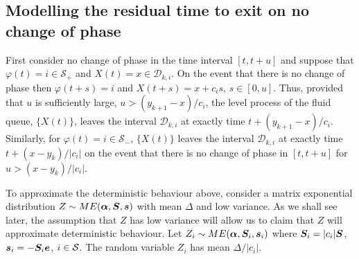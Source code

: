 \subsection{Modelling the residual time to exit on no change of phase} 
First consider no change of phase in the time interval \([t,t+u]\) and suppose that \(\varphi(t)=i\in\mathcal S_+\) and \(X(t) = x\in\mathcal D_{k,i}\). On the event that there is no change of phase then \(\varphi(t+s) = i\) and \(X(t+s) = x+c_i s\), \(s\in{}[0,u]\). Thus, provided that \(u\) is sufficiently large, \(u>(y_{k+1}-x)/c_i\), the level process of the fluid queue, \(\{X(t)\}\), leaves the interval \(\mathcal D_{k,i}\) at exactly time \(t+(y_{k+1} - x)/c_i\). Similarly, for \(\varphi(t)=i\in\mathcal S_-\), \(\{X(t)\}\) leaves the interval \(\mathcal D_{k,i}\) at exactly time \(t+(x-y_k)/|c_i|\) on the event that there is no change of phase in \([t,t+u]\) for \(u>(x-y_k)/|c_i|\). 

To approximate the deterministic behaviour above, consider a matrix exponential distribution \(Z\sim ME(\boldsymbol \alpha, \boldsymbol S, \boldsymbol s)\) with mean \(\Delta\) and low variance. As we shall see later, the assumption that \(Z\) has low variance will allow us to claim that \(Z\) will approximate deterministic behaviour. Let \(Z_i\sim ME(\boldsymbol \alpha, \boldsymbol S_i, \boldsymbol s_i)\) where \(\boldsymbol S_i = |c_i|\boldsymbol S\), \(\boldsymbol s_i=-\boldsymbol S_i\boldsymbol e\), \(i\in\mathcal{S}\). The random variable \(Z_i\) has mean \(\Delta/|c_i|\). 

